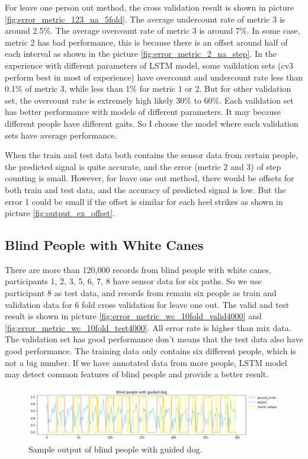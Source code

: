 \documentclass[11pt]{article}
\begin{document}
{For leave one person out method, the cross validation result is shown in picture \ref{fig:error_metric_123_na_5fold}.
The average undercount rate of metric 3 is around 2.5\%. The average overcount rate of metric 3 is around 7\%.
 In some case, metric 2 has bad performance, this is because there is an offset around half of each interval as shown in the picture  \ref{fig:error_metric_2_na_step}. 
 In the experience with different parameters of LSTM model,  some vaildation sets (cv3 perform best in most of experience) have overcount and undercount rate less than 0.1\% of metric 3, while less than 1\% for metric 1 or 2. But for other validation set, the overcount rate is extremely high likely 30\% to 60\%. Each vaildation set has better performance with models of different parameters. It may because different people have different gaits. So I choose the model where each validation sets have average performance. 

When the train and test data both contains the sensor data from certain people,  the predicted signal is quite accurate, and the error (metric 2 and 3) of step counting is small. However, for leave one out method, there would be offsets for both train and test data, and the accuracy of predicted signal is low. But the error 1 could be small if the offset is similar for each heel strikes as shown in picture \ref{fig:output_ex_offset}. 

\subsection{Blind People with White Canes}
There are more than 120,000 records from blind people with white canes, participants 1, 2, 3, 5, 6, 7, 8 have sensor data for six paths. So we use participant 8 as test data, and records from remain six people as train and validation data for 6 fold cross validation for leave one out. The valid and test result is shown in picture \ref{fig:error_metric_wc_10fold_valid4000} and \ref{fig:error_metric_wc_10fold_test4000}. All error rate is higher than mix data. The validation set has good performance don't means that the test data also have good performance.
The training data only contains six different people, which is not a big number. If we have annotated data from more people, LSTM model may detect common features of blind people and provide a better result.

\begin{figure}[ht]
\centering
\includegraphics[scale=0.5]{blind_gd}
\caption{Sample output of blind people with guided dog.}
\label{fig:blind_gd}
\end{figure}


}
\end{document}

